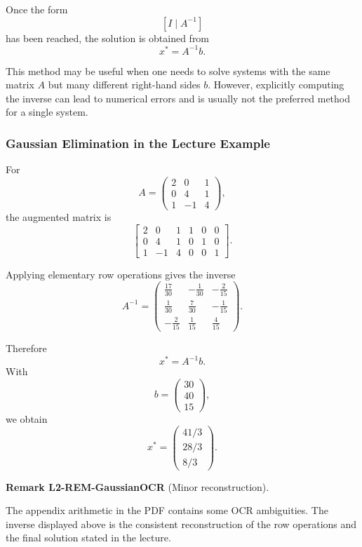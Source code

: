 \documentclass[10pt, letterpaper]{article}
\newcommand{\CustomHeading}[3]{%
  \par\medskip\noindent%
  \textbf{#1 #2} \textnormal{(#3)}.\enskip%
}
\newenvironment{REM}[2]{\CustomHeading{Remark}{#1}{#2}}{}
\begin{document}
Once the form
\[
[I\mid A^{-1}]
\]
has been reached, the solution is obtained from
\[
x^\ast=A^{-1}b.
\]

This method may be useful when one needs to solve systems with the same matrix \(A\) but many different right-hand sides \(b\). However, explicitly computing the inverse can lead to numerical errors and is usually not the preferred method for a single system.

\subsubsection{Gaussian Elimination in the Lecture Example}

For
\[
A=
\begin{pmatrix}
2&0&1\\
0&4&1\\
1&-1&4
\end{pmatrix},
\]
the augmented matrix is
\[
\left[
\begin{array}{ccc|ccc}
2&0&1&1&0&0\\
0&4&1&0&1&0\\
1&-1&4&0&0&1
\end{array}
\right].
\]

Applying elementary row operations gives the inverse
\[
A^{-1}
=
\begin{pmatrix}
\frac{17}{30} & -\frac{1}{30} & -\frac{2}{15}\\
\frac{1}{30} & \frac{7}{30} & -\frac{1}{15}\\
-\frac{2}{15} & \frac{1}{15} & \frac{4}{15}
\end{pmatrix}.
\]

Therefore
\[
x^\ast=A^{-1}b.
\]
With
\[
b=
\begin{pmatrix}
30\\
40\\
15
\end{pmatrix},
\]
we obtain
\[
x^\ast
=
\begin{pmatrix}
41/3\\
28/3\\
8/3
\end{pmatrix}.
\]

\begin{REM}{L2-REM-GaussianOCR}{Minor reconstruction}
The appendix arithmetic in the PDF contains some OCR ambiguities. The inverse displayed above is the consistent reconstruction of the row operations and the final solution stated in the lecture.
\end{REM}
\end{document}
